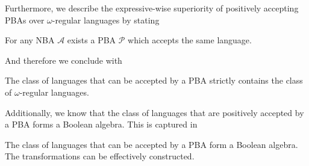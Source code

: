 Furthermore, we describe the expressive-wise superiority of positively 
accepting \acp{PBA} over $\omega$-regular languages by stating
\begin{lemma}
  \cite[Lemma 5]{RecOmeLangProbAuto} For any \ac{NBA} $\mathcal{A}$ exists a
  \ac{PBA} $\mathcal{P}$ which accepts the same language.
\end{lemma}
And therefore we conclude with
\begin{theorem}
  \cite[Theorem 4]{RecOmeLangProbAuto}
  The class of languages that can be accepted by a \ac{PBA} strictly contains
  the class of $\omega$-regular languages.
\end{theorem}
Additionally, we know that the class of languages that are positively accepted 
by a \ac{PBA} forms a Boolean algebra. This is captured in
\begin{theorem}
  \cite[Chapter 4.3.]{Groesser}
  The class of languages that can be accepted by a \ac{PBA} form a Boolean 
  algebra. The transformations can be effectively constructed.
  \label{thm:pbaboolalgebra}
\end{theorem}
